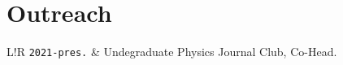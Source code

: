 \documentclass{article}
\newcommand\VRule{\color{white}\vrule width 0.5pt}
\begin{document}
\section*{Outreach}
\begin{tabular}{L!{\VRule}R}
\texttt{2021-pres.} & Undegraduate Physics Journal Club, Co-Head.
\end{tabular}
\end{document}
